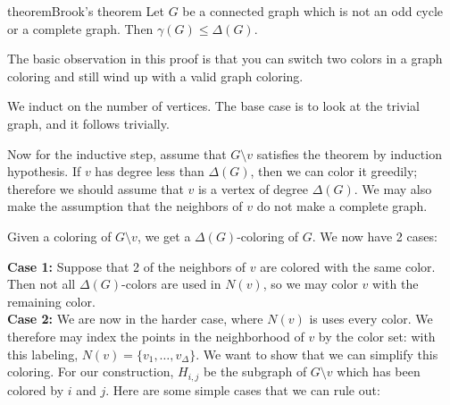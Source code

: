\begin{doubledpage}{theorem}{Brook's theorem \cite{brooks1941colouring}}{ 
  Let $G$ be a connected graph which is not an odd cycle or a complete graph. Then $\gamma(G)\leq \Delta(G)$. \label{emb:thm:brooks}}


The basic observation in this proof is that you can switch two colors in a graph coloring and still wind up with a valid graph coloring. 

 We induct on the number of vertices. The base case is to look at the trivial graph, and it follows trivially. 

  Now for the inductive step, assume that $G\setminus v$ satisfies the theorem by induction hypothesis. If $v$ has degree less than $\Delta(G)$, then we can color it greedily; therefore we should assume that $v$ is a vertex of degree $\Delta(G)$. We may also make the assumption that the neighbors of $v$ do not make a complete graph. 
  
  Given a coloring of $G\setminus v$, we get a $\Delta(G)$-coloring of $G$. We now have 2 cases:

 \textbf{Case 1:} Suppose that 2 of the neighbors of $v$ are colored with the same color. Then not all $\Delta(G)$-colors are used in $N(v)$, so we may color $v$ with the remaining color. \\
 \textbf{Case 2:} We are now in the harder case, where $N(v)$ is uses every color. We therefore may index the points in the neighborhood of $v$ by the color set: with this labeling, $N(v)=\{v_1, \ldots, v_\Delta\}$. We want to show that we can simplify this coloring. For our construction,  $H_{i,j}$ be the subgraph of $G\setminus v$ which has been colored by $i$ and $j$. Here are some simple cases that we can rule out: 
 

\end{doubledpage}
